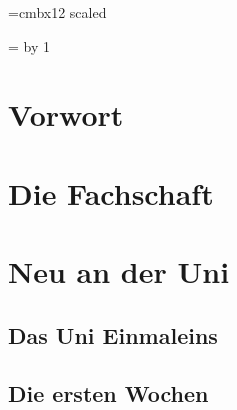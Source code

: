 \documentclass[12pt, a4paper]{article}
\newif\ifinfo
\begin{document}
\emergencystretch=2cm

\font\vlarge=cmbx12 scaled 
\newdimen\oldbaselineskp
\newcount\auflage
\newcount\jahr
\newcount\jahrpluseins
\setcounter{secnumdepth}{0}

\newcommand*{\email}[1]{\url{#1}}
\newcommand*{\filename}[1]{\url{#1}}



\jahrpluseins=\jahr
\advance \jahrpluseins by 1

\ifinfo
	
\else
	
\fi

\ifinfo
	
\else
	
\fi


\section{Vorwort}
\ifinfo
	
\else
	
\fi


\tableofcontents
\newpage

\onecolumn
\section{Die Fachschaft}
\ifinfo
	
\else
	
\fi

\section{Neu an der Uni}
\subsection{Das Uni Einmaleins}
\ifinfo
	

	\subsection{Die ersten Wochen}
	
\end{document}
